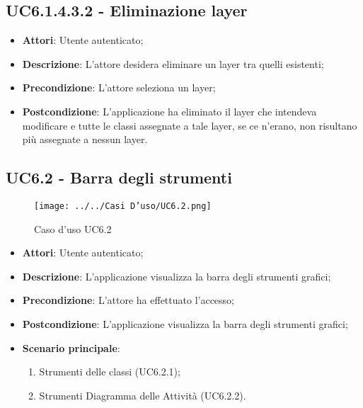 \subsection{UC6.1.4.3.2 - Eliminazione layer} 
\label{ssec:UC6.1.4.3.2} 
\begin{itemize} 
\item \textbf{Attori}: Utente autenticato;
\item \textbf{Descrizione}: L'attore desidera eliminare un layer tra quelli esistenti;
\item \textbf{Precondizione}: L'attore seleziona un layer;
\item \textbf{Postcondizione}: L'applicazione ha eliminato il layer che intendeva modificare e tutte le classi assegnate a tale layer, se ce n'erano, non risultano più assegnate a nessun layer.
\end{itemize} 
\newpage
\subsection{UC6.2 - Barra degli strumenti} 
\label{ssec:UC6.2} 
\begin{figure}[h!] 
\centering 
\texttt{[image: ../../Casi D'uso/UC6.2.png]} 
\caption{Caso d'uso UC6.2} 
 \end{figure} 
\begin{itemize} 
\item \textbf{Attori}: Utente autenticato;
\item \textbf{Descrizione}: L'applicazione visualizza la barra degli strumenti grafici;
\item \textbf{Precondizione}: L'attore ha effettuato l'accesso;
\item \textbf{Postcondizione}: L'applicazione visualizza la barra degli strumenti grafici;
\item \textbf{Scenario principale}: \begin{enumerate}\item Strumenti delle classi (UC6.2.1);\item Strumenti Diagramma delle Attività (UC6.2.2). 
 \end{enumerate}
\end{itemize} 
\newpage
